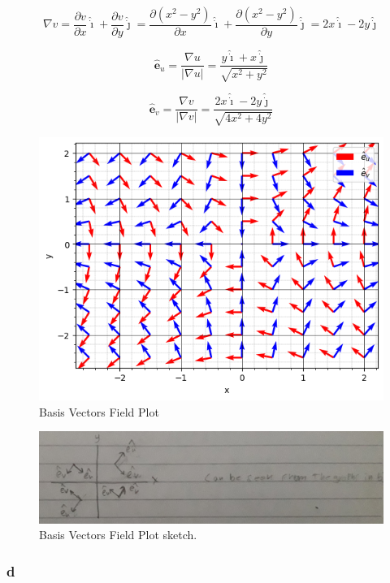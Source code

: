 \documentclass[12pt]{article}
\begin{document}
\[
    \nabla v = \frac{ \partial v}{\partial x} \hat{\dot{\imath}}
    + \frac{ \partial v}{\partial y}  \hat{\dot{\jmath}}
    = \frac{ \partial (x^2 - y^2)}{\partial x}  \hat{\dot{\imath}}
    + \frac{ \partial (x^2 - y^2)}{\partial y}  \hat{\dot{\jmath}}
    = 2x  \hat{\dot{\imath}} - 2y  \hat{\dot{\jmath}}
\]

\[
    \hat{\textbf{e}}_u = \frac{\nabla u}{|\nabla u|} = \frac{y  \hat{\dot{\imath}}
        + x  \hat{\dot{\jmath}}}{\sqrt{x^2 + y^2}}
\]

\[
    \hat{\textbf{e}}_v = \frac{\nabla v}{|\nabla v|} = \frac{2x  \hat{\dot{\imath}}
        - 2y  \hat{\dot{\jmath}}}{\sqrt{4x^2 + 4y^2}}
\]

\begin{figure}[H]
    \includegraphics[width=\linewidth]{Q1C.png}
    \caption{Basis Vectors Field Plot}\label{fig:Q1C}
\end{figure}

\begin{figure}[H]
    \includegraphics[width=\linewidth]{Q1C.jpg}
    \caption{Basis Vectors Field Plot sketch.}\label{fig:Q1C2}
\end{figure}

\subsubsection{d}
\end{document}
